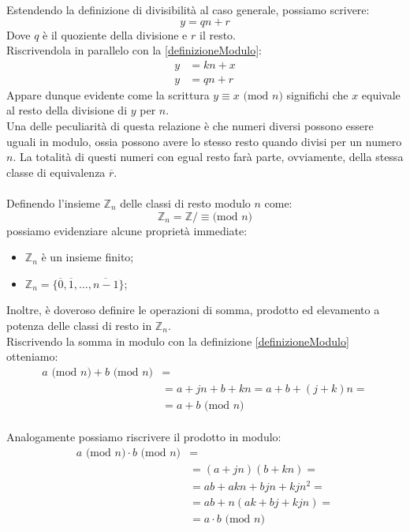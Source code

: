 \documentclass[a4paper,12pt]{article}
\begin{document}
Estendendo la definizione di divisibilità al caso generale, possiamo scrivere:
\begin{equation}
    y=qn+r
\end{equation}
Dove $q$ è il quoziente della divisione e $r$ il resto.\\
Riscrivendola in parallelo con la \eqref{definizioneModulo}:
\begin{equation} \label{parallelo}
\begin{split}
y & = kn+x \\
y & = qn+r
\end{split}
\end{equation}
Appare dunque evidente come la scrittura $y \equiv x \text{ (mod $n$)}$ significhi che $x$ equivale al resto della divisione di $y$ per $n$.\\
Una delle peculiarità di questa relazione è che numeri diversi possono essere uguali in modulo, ossia possono avere lo stesso resto quando divisi per un numero $n$. La totalità di questi numeri con egual resto farà parte, ovviamente, della stessa classe di equivalenza $\overline{r}$.\\\\
Definendo l'insieme $\mathbb{Z}_n$ delle classi di resto modulo $n$ come:
\begin{equation}\label{Zn}
\mathbb{Z}_n = \mathbb{Z}/\equiv \text{(mod $n$)}
\end{equation}
possiamo evidenziare alcune proprietà immediate:
\begin{itemize}
    \item $\mathbb{Z}_n$ è un insieme finito;
    \item $\mathbb{Z}_n=\{ \overline{0},\overline{1},\hdots,\overline{n-1}\}$;
\end{itemize}
Inoltre, è doveroso definire le operazioni di somma, prodotto ed elevamento a potenza delle classi di resto in $\mathbb{Z}_n$.\\
Riscrivendo la somma in modulo con la definizione \eqref{definizioneModulo} otteniamo:
\begin{equation}
\begin{split}
a \text{ (mod $n$)} + b \text{ (mod $n$)} & = \\
& = a+jn + b + kn = a+b + (j+k)n =\\
& = a+b\text{ (mod $n$)}
\end{split}
\end{equation}\\
Analogamente possiamo riscrivere il prodotto in modulo:
\begin{equation}
\begin{split}
a \text{ (mod $n$)} \cdot b \text{ (mod $n$)} & = \\
& = (a+jn) (b + kn) =\\
& = ab +akn +bjn +kjn^2=\\
& = ab + n(ak+bj+kjn)=\\
& = a\cdot b\text{ (mod $n$)}
\end{split}
\end{equation}
\end{document}
